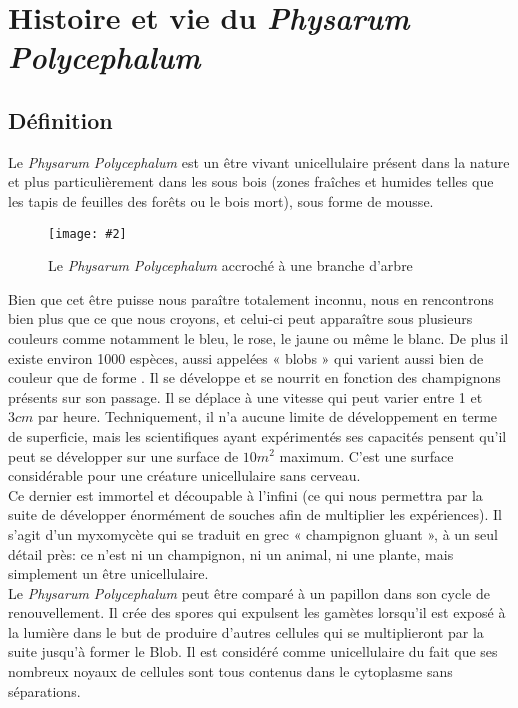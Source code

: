 \documentclass[]{report}
\newcommand{\includeimage}[2][]{%
\imgsrc{#2}
\begin{latexonly}
    \texttt{[image: \#2]}
\end{latexonly}
}
\theoremstyle{definition}
\begin{document}
\section{Histoire et vie du \textit{Physarum Polycephalum}}
\subsection{Définition}
{Le \textit{Physarum Polycephalum} est un être vivant unicellulaire présent dans la nature et plus particulièrement dans les sous bois \cite{wikipedia} (zones fraîches et humides telles que les tapis de feuilles des forêts ou le bois mort), sous forme de mousse.}

\begin{figure}[H]
    \centering
    \includeimage[height=5cm]{physarum-polycephalum-bois.jpg}
    \caption{Le \textit{Physarum Polycephalum} accroché à une branche d'arbre}
\end{figure}

{Bien que cet être puisse nous paraître totalement inconnu, nous en rencontrons bien plus que ce que nous croyons, et celui-ci peut apparaître sous plusieurs couleurs comme notamment le bleu, le rose, le jaune ou même le blanc. De plus il existe environ 1000 espèces, aussi appelées « blobs » qui varient aussi bien de couleur que de forme \cite{blob}. 
Il se développe et se nourrit en fonction des champignons présents sur son passage. Il se déplace à une vitesse qui peut varier entre 1 et \(3cm\) par heure. Techniquement, il n’a aucune limite de développement en terme de superficie, mais les scientifiques ayant expérimentés ses capacités pensent qu’il peut se développer sur une surface de \(10m^2\) maximum. C’est une surface considérable pour une créature unicellulaire sans cerveau.}\\
{Ce dernier est immortel et découpable à l’infini (ce qui nous permettra par la suite  de développer énormément de souches afin de multiplier les expériences). Il s’agit d’un myxomycète \cite{wikipedia} qui se traduit en grec « champignon gluant », à un seul détail près: ce n’est ni un champignon, ni un animal, ni une plante, mais simplement un être unicellulaire.}\\
{Le \textit{Physarum Polycephalum} peut être comparé à un papillon dans son cycle de renouvellement. Il crée des spores qui expulsent les gamètes lorsqu’il est exposé à la lumière dans le but de produire d’autres cellules qui se multiplieront par la suite jusqu’à former le Blob. Il est considéré comme unicellulaire du fait que ses nombreux noyaux de cellules sont tous contenus dans le cytoplasme sans séparations.}
\end{document}
